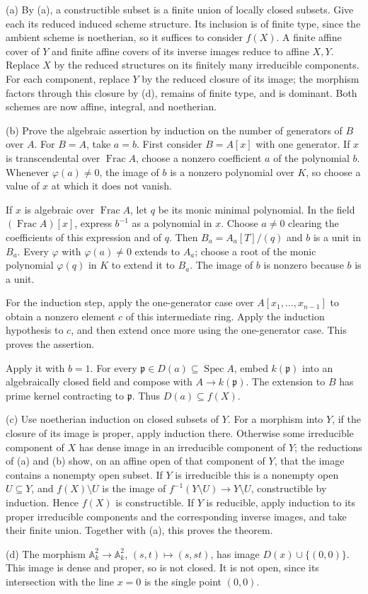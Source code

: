 (a) By (a), a constructible subset is a finite union of locally closed subsets. Give each its reduced induced scheme structure. Its inclusion is of finite type, since the ambient scheme is noetherian, so it suffices to consider $f(X)$. A finite affine cover of $Y$ and finite affine covers of its inverse images reduce to affine $X,Y$. Replace $X$ by the reduced structures on its finitely many irreducible components. For each component, replace $Y$ by the reduced closure of its image; the morphism factors through this closure by (d), remains of finite type, and is dominant. Both schemes are now affine, integral, and noetherian.

(b) Prove the algebraic assertion by induction on the number of generators of $B$ over $A$. For $B=A$, take $a=b$. First consider $B=A[x]$ with one generator. If $x$ is transcendental over $\operatorname{Frac}A$, choose a nonzero coefficient $a$ of the polynomial $b$. Whenever $\varphi(a)\ne0$, the image of $b$ is a nonzero polynomial over $K$, so choose a value of $x$ at which it does not vanish.

If $x$ is algebraic over $\operatorname{Frac}A$, let $q$ be its monic minimal polynomial. In the field $(\operatorname{Frac}A)[x]$, express $b^{-1}$ as a polynomial in $x$. Choose $a\ne0$ clearing the coefficients of this expression and of $q$. Then $B_a=A_a[T]/(q)$ and $b$ is a unit in $B_a$. Every $\varphi$ with $\varphi(a)\ne0$ extends to $A_a$; choose a root of the monic polynomial $\varphi(q)$ in $K$ to extend it to $B_a$. The image of $b$ is nonzero because $b$ is a unit.

For the induction step, apply the one-generator case over $A[x_1,\ldots,x_{n-1}]$ to obtain a nonzero element $c$ of this intermediate ring. Apply the induction hypothesis to $c$, and then extend once more using the one-generator case. This proves the assertion.

Apply it with $b=1$. For every $\mathfrak p\in D(a)\subseteq\operatorname{Spec}A$, embed $k(\mathfrak p)$ into an algebraically closed field and compose with $A\to k(\mathfrak p)$. The extension to $B$ has prime kernel contracting to $\mathfrak p$. Thus $D(a)\subseteq f(X)$.

(c) Use noetherian induction on closed subsets of $Y$. For a morphism into $Y$, if the closure of its image is proper, apply induction there. Otherwise some irreducible component of $X$ has dense image in an irreducible component of $Y$; the reductions of (a) and (b) show, on an affine open of that component of $Y$, that the image contains a nonempty open subset. If $Y$ is irreducible this is a nonempty open $U\subseteq Y$, and $f(X)\setminus U$ is the image of $f^{-1}(Y\setminus U)\to Y\setminus U$, constructible by induction. Hence $f(X)$ is constructible. If $Y$ is reducible, apply induction to its proper irreducible components and the corresponding inverse images, and take their finite union. Together with (a), this proves the theorem.

(d) The morphism $\mathbb A_k^2\to\mathbb A_k^2$, $(s,t)\mapsto(s,st)$, has image $D(x)\cup\{(0,0)\}$. This image is dense and proper, so is not closed. It is not open, since its intersection with the line $x=0$ is the single point $(0,0)$.
